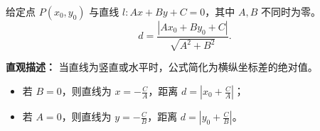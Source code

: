 \begin{statementbox}
给定点 $P(x_0,y_0)$ 与直线 $l:Ax+By+C=0$，其中 $A,B$ 不同时为零。
\[
 \boxed{d=\frac{|Ax_0+By_0+C|}{\sqrt{A^2+B^2}}}.
\]


\begin{description}[style=nextline,leftmargin=2.8em,labelsep=.5em,itemsep=.45em]
		\item[\textbf{\textcolor{CStatement}{推广结论（特殊直线情形）：}}]
			\textbf{\textcolor{CStatement}{直观描述：}}
			当直线为竖直或水平时，公式简化为横纵坐标差的绝对值。
			\begin{itemize}
			\item 若 $B=0$，则直线为 $x = -\frac{C}{A}$，距离 $d = \left\lvert x_0 + \frac{C}{A} \right\rvert$；
			\item 若 $A=0$，则直线为 $y = -\frac{C}{B}$，距离 $d = \left\lvert y_0 + \frac{C}{B} \right\rvert$。
		\end{itemize}

	\end{description}

\end{statementbox}
